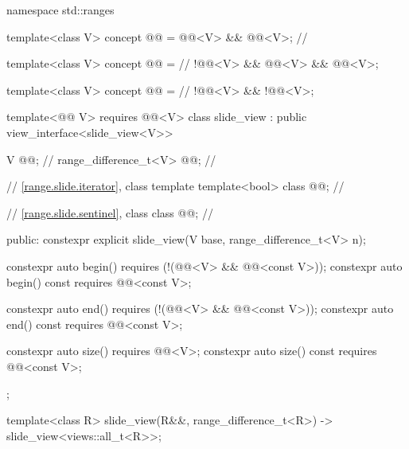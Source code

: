 %
%
%
\begin{codeblock}
namespace std::ranges {
  template<class V>
  concept @@ = @@<V> && @@<V>;       // \expos

  template<class V>
  concept @@ =                                            // \expos
    !@@<V> && @@<V> && @@<V>;

  template<class V>
  concept @@ =                                           // \expos
    !@@<V> && !@@<V>;

  template<@@ V>
    requires @@<V>
  class slide_view : public view_interface<slide_view<V>> {
    V @@;                            // \expos
    range_difference_t<V> @@;           // \expos

    // \ref{range.slide.iterator}, class template 
    template<bool> class @@;      // \expos

    // \ref{range.slide.sentinel}, class 
    class @@;                     // \expos

  public:
    constexpr explicit slide_view(V base, range_difference_t<V> n);

    constexpr auto begin()
      requires (!(@@<V> && @@<const V>));
    constexpr auto begin() const requires @@<const V>;

    constexpr auto end()
      requires (!(@@<V> && @@<const V>));
    constexpr auto end() const requires @@<const V>;

    constexpr auto size() requires @@<V>;
    constexpr auto size() const requires @@<const V>;
  };

  template<class R>
    slide_view(R&&, range_difference_t<R>) -> slide_view<views::all_t<R>>;
}
\end{codeblock}

